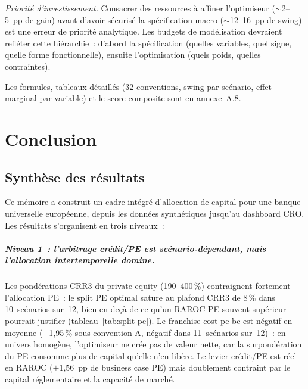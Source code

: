 \documentclass[10pt, a4paper, oneside]{report}
\theoremstyle{definition}
\begin{document}
\emph{Priorité d'investissement.} Consacrer des ressources à affiner l'optimiseur ($\sim$2--5~pp de gain) avant d'avoir sécurisé la spécification macro ($\sim$12--16~pp de swing) est une erreur de priorité analytique. Les budgets de modélisation devraient refléter cette hiérarchie~: d'abord la spécification (quelles variables, quel signe, quelle forme fonctionnelle), ensuite l'optimisation (quels poids, quelles contraintes).

Les formules, tableaux détaillés (32 conventions, swing par scénario, effet marginal par variable) et le score composite sont en annexe~A.8.



\chapter*{Conclusion}
\label{chap:conclusion}

\section*{Synthèse des résultats}

Ce mémoire a construit un cadre intégré d'allocation de capital pour une banque universelle européenne, depuis les données synthétiques jusqu'au dashboard CRO. Les résultats s'organisent en trois niveaux~:

\paragraph{Niveau 1~: l'arbitrage crédit/PE est scénario-dépendant, mais l'allocation intertemporelle domine.} Les pondérations CRR3 du private equity (190--400\,\%) contraignent fortement l'allocation PE~: le split PE optimal sature au plafond CRR3 de 8\,\% dans 10~scénarios sur~12, bien en deçà de ce qu'un RAROC PE souvent supérieur pourrait justifier (tableau~\ref{tab:split-pe}). Le franchise cost pe-bc est négatif en moyenne ($-$1{,}95\,\% sous convention A, négatif dans 11~scénarios sur~12)~: en univers homogène, l'optimiseur ne crée pas de valeur nette, car la surpondération du PE consomme plus de capital qu'elle n'en libère. Le levier crédit/PE est réel en RAROC ($+$1{,}56~pp de business case PE) mais doublement contraint par le capital réglementaire et la capacité de marché.
\end{document}
